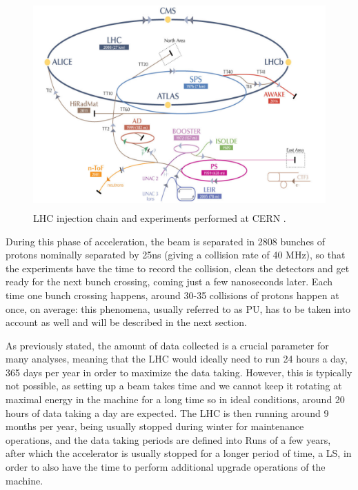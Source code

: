 \documentclass[a4paper, 10pt, openright]{report}
\begin{document}
\begin{figure}[htbp]
\begin{center}
\includegraphics[width=12cm, height=8cm]{figs/LHCChain.png}
\caption{LHC injection chain and experiments performed at \ac{CERN} \cite{AWAKE}.}
\label{fig:Chain}
\end{center}
\end{figure}

During this phase of acceleration, the beam is separated in 2808 bunches of protons nominally separated by 25ns (giving a collision rate of 40 MHz), so that the experiments have the time to record the collision, clean the detectors and get ready for the next bunch crossing, coming just a few nanoseconds later. Each time one bunch crossing happens, around 30-35 collisions of protons happen at once, on average: this phenomena, usually referred to as \ac{PU}, has to be taken into account as well and will be described in the next section.

As previously stated, the amount of data collected is a crucial parameter for many analyses, meaning that the \ac{LHC} would ideally need to run 24 hours a day, 365 days per year in order to maximize the data taking. However, this is typically not possible, as setting up a beam takes time and we cannot keep it rotating at maximal energy in the machine for a long time so in ideal conditions, around 20 hours of data taking a day are expected. The \ac{LHC} is then running around 9 months per year, being usually stopped during winter for maintenance operations, and the data taking periods are defined into Runs of a few years, after which the accelerator is usually stopped for a longer period of time, a \ac{LS}, in order to also have the time to perform additional upgrade operations of the machine. 
\end{document}
